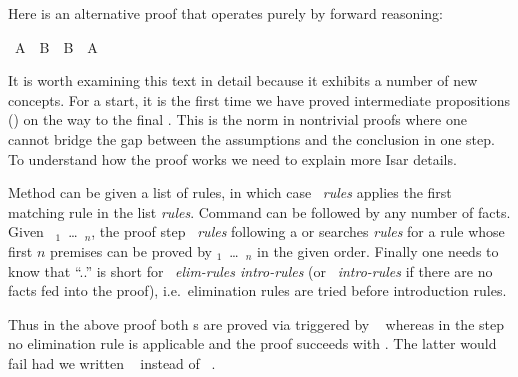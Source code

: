 \begin{isabellebody}
\begin{isamarkuptext}
Here is an alternative proof that operates purely by forward reasoning:%
\end{isamarkuptext}%
\isamarkuptrue%
\ {\isachardoublequote}A\ {\isasymand}\ B\ {\isasymlongrightarrow}\ B\ {\isasymand}\ A{\isachardoublequote}\isanewline
\isamarkupfalse%
\isamarkupfalse%
\isamarkupfalse%
\isamarkupfalse%
\isamarkupfalse%
\isamarkupfalse%
\isamarkupfalse%
\isamarkupfalse%
\isamarkupfalse%
\isamarkupfalse%
\isamarkupfalse%
\isamarkupfalse%
\isamarkupfalse%
%
\begin{isamarkuptext}%
\noindent It is worth examining this text in detail because it
exhibits a number of new concepts.  For a start, it is the first time
we have proved intermediate propositions () on the
way to the final . This is the norm in nontrivial
proofs where one cannot bridge the gap between the assumptions and the
conclusion in one step. To understand how the proof works we need to
explain more Isar details.

Method  can be given a list of rules, in which case
~\textit{rules}\isa{{\isacharparenright}} applies the first matching
rule in the list \textit{rules}. Command  can be
followed by any number of facts.  Given ~$_1$~\dots~$_n$, the proof step
~\textit{rules}\isa{{\isacharparenright}} following a 
or  searches \textit{rules} for a rule whose first
$n$ premises can be proved by $_1$~\dots~$_n$ in the
given order. Finally one needs to know that ``..'' is short for
~\textit{elim-rules intro-rules}\isa{{\isacharparenright}} (or
~\textit{intro-rules}\isa{{\isacharparenright}} if there are no facts
fed into the proof), i.e.\ elimination rules are tried before
introduction rules.

Thus in the above proof both s are proved via
 triggered by ~ whereas
in the  step no elimination rule is applicable and
the proof succeeds with . The latter would fail had
we written ~ instead of
~.


\end{isamarkuptext}
\end{isabellebody}
